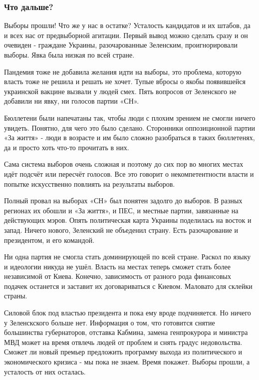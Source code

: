  
 
 

\subsubsection{Что дальше?}
\label{sec:01_11_2020.fb.alex_belyy.1.vybory}

Выборы прошли! Что же у нас в остатке? Усталость кандидатов и их штабов, да и
всех нас от предвыборной агитации. Первый вывод можно сделать сразу и он
очевиден - граждане Украины, разочарованные Зеленским, проигнорировали выборы.
Явка была низкая по всей стране. 

Пандемия тоже не добавила желания идти на выборы, это  проблема, которую власть
тоже не решила и решать не хочет. Тупые вбросы о якобы появившейся украинской
вакцине вызвали у людей смех. Пять вопросов от Зеленского не добавили ни явку,
ни голосов партии «СН».

Бюллетени были напечатаны так, чтобы люди с плохим зрением не смогли ничего
увидеть. Понятно, для чего это было сделано. Сторонники оппозиционной партии
«За життя» - люди в возрасте и им было сложно разобраться в таких бюллетенях,
да и просто хоть что-то прочитать в них.  

Сама система выборов очень сложная и поэтому до сих пор во многих местах идёт
подсчёт или пересчёт голосов. Все это говорит о некомпетентности власти и
попытке искусственно повлиять на результаты выборов.

Полный провал на выборах «СН» был понятен задолго до выборов.  В разных
регионах их обошли и «За життя», и ПЕС, и местные партии, завязанные на
действующих мэров. Опять политическая карта Украины поделилась на восток и
запад. Ничего нового, Зеленский не объеденил страну. Есть разочарование и
президентом, и его командой.  

Ни одна партия не смогла стать доминирующей по всей стране. Раскол по языку и
идеологии никуда не ушёл. Власть на местах теперь сможет стать более
независимой от Киева. Конечно, зависимость от разного рода финансовых подачек
останется и заставит их договариваться с Киевом.
Маловато для склейки страны. 

Силовой блок под властью президента и пока ему вроде подчиняется. Но ничего у
Зеленскского больше нет. Информация о том, что готовится снятие большинства
губернаторов, отставка Кабмина, замена генпрокурора и министра МВД может на
время отвлечь людей от проблем и снять градус недовольства. Сможет ли новый
премьер предложить программу выхода из политического и экономического кризиса -
мы пока не знаем. Время покажет.  Выборы прошли, а усталость от них осталась.

